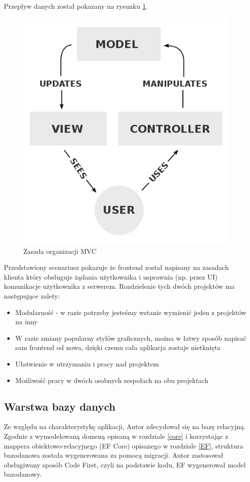 \documentclass[12pt]{article}
\numberwithin{figure}{section}
\begin{document}
\begin{sloppypar}
Przepływ danych został pokazany na rysunku \ref{fig:mvc-flow}.
    
\begin{figure}[H] 
    \centering
    \includegraphics[width=.5\textwidth]{images/chapter_3/mvc-flow.png}
    \caption{Zasada organizacji MVC \cite{mvc-flow}}
    \label{fig:mvc-flow}
\end{figure}
    
Przedstawiony scenariusz pokazuje że frontend został napisany na zasadach klienta który obsługuje żądania użytkownika i usprawnia (np. przez UI) komunikacje użytkownika z serwerem. 
Rozdzielenie tych dwóch projektów ma następujące zalety:
\begin{itemize}
    \item Modularność - w razie potrzeby jesteśmy wstanie wymienić jeden z projektów na inny
    \item W razie zmiany popularny stylów graficznych, można w łatwy sposób napisać sam frontend od nowa, dzięki czemu cała aplikacja zostaje nietknięta
    \item Ułatwienie w utrzymaniu i pracy nad projektem
    \item Możliwość pracy w dwóch osobnych zespołach na obu projektach
\end{itemize}
    

\subsection{Warstwa bazy danych}
Ze względu na charakterystykę aplikacji, Autor zdecydował się na bazę relacyjną.
Zgodnie z wymodelowaną domeną opisaną w rozdziale \ref{core} i korzystając z mappera obiektowo-relacyjnego (EF Core) opisanego w rozdziale \ref{EF}, struktura bazodanowa została wygenerowana za pomocą migracji. Autor zastosował obsługiwany sposób Code First, czyli na podstawie kodu, EF wygenerował model bazodanowy.
    

\end{sloppypar}
\end{document}
